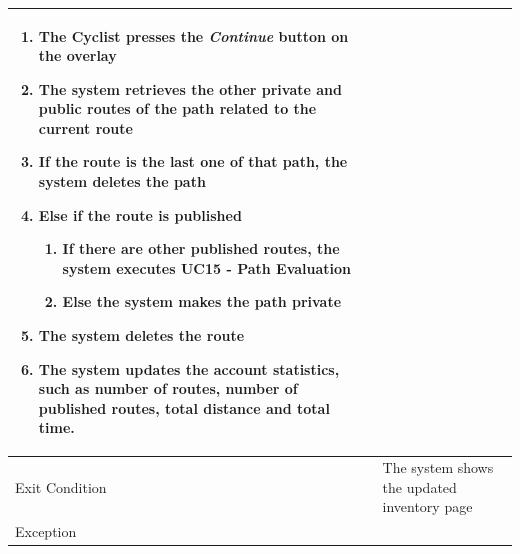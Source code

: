 \begin{itemize}
\begin{tabular}{|p{7cm}|p{7cm}|}
\begin{enumerate}[label=\arabic*.]
    \item The Cyclist presses the \textit{Continue} button on the overlay 
    \item The system retrieves the other private and public routes of the path related to the current route
    \item If the route is the last one of that path, the system deletes the path
    \item Else if the route is published 
        \begin{enumerate} [label=\arabic{enumi}.\arabic*.]
            \item If there are other published routes, the system executes \textbf{UC15 - Path Evaluation}
            \item Else the system makes the path private 
        \end{enumerate} 
    \item The system deletes the route
    \item The system updates the account statistics, such as number of routes, number of published routes, total distance and total time.
\end{enumerate}
\\ \hline
Exit Condition  & The system shows the updated inventory page \\ \hline
Exception       &
\\ \hline
\end{tabular}
\end{itemize}
\newpage
